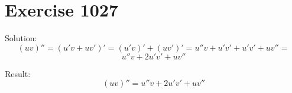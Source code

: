 \documentclass[a4paper, 10pt]{scrartcl}
\begin{document}
\section{Exercise 1027}

Solution:
\[
(uv)'' = (u'v + uv')' = (u'v)' + (uv')' = u''v + u'v' + u'v' + uv'' =
\]
\[
u''v + 2u'v' + uv''
\]

Result:
\[
(uv)'' = u''v + 2u'v' + uv''
\]
\end{document}
